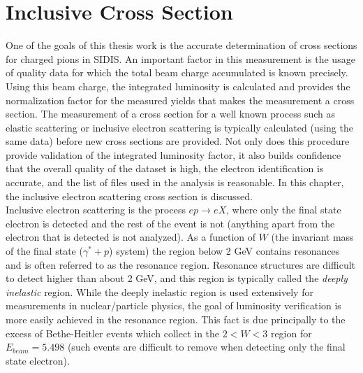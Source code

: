 %

\chapter{Inclusive Cross Section}

One of the goals of this thesis work is the accurate determination of cross sections for charged pions in SIDIS.  An important factor in this measurement is the usage of quality data for which the total beam charge accumulated is known precisely.  Using this beam charge, the integrated luminosity is calculated and provides the normalization factor for the measured yields that makes the measurement a cross section.  The measurement of a cross section for a well known process such as elastic scattering or inclusive electron scattering is typically calculated (using the same data) before new cross sections are provided.  Not only does this procedure provide validation of the integrated luminosity factor, it also builds confidence that the overall quality of the dataset is high, the electron identification is accurate, and the list of files used in the analysis is reasonable.  In this chapter, the inclusive electron scattering cross section is discussed. \\

Inclusive electron scattering is the process $e p \rightarrow e X$, where only the final state electron is detected and the rest of the event is not (anything apart from the electron that is detected is not analyzed).  As a function of $W$ (the invariant mass of the final state ($\gamma^* + p$) system) the region below 2 GeV contains resonances and is often referred to as the resonance region.  Resonance structures are difficult to detect higher than about 2 GeV, and this region is typically called the \textit{deeply inelastic} region.  While the deeply inelastic region is used extensively for measurements in nuclear/particle physics, the goal of luminosity verification is more easily achieved in the resonance region.  This fact is due principally to the excess of Bethe-Heitler events which collect in the $2 < W < 3$ region for $E_{beam} = 5.498$ (such events are difficult to remove when detecting only the final state electron). \\

